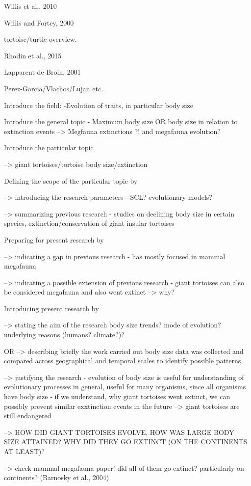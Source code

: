 Willis et al., 2010

Willis and Fortey, 2000

tortoise/turtle overview.

Rhodin et al., 2015

Lapparent de Broin, 2001

Perez-Garcia/Vlachos/Lujan etc.


Introduce the field:
-Evolution of traits, in particular body size

Introduce the general topic
- Maximum body size OR body size in relation to extinction events
--> Megfauna extinctions ?! and megafauna evolution?

Introduce the particular topic

--> giant tortoises/tortoise body size/extinction

Defining the scope of the particular topic by

--> introducing the research parameters
- SCL? evolutionary models?

--> summarizing previous research
- studies on declining body size in certain species, extinction/conservation of giant insular tortoises

Preparing for present research by

--> indicating a gap in previous research
- has mostly focused in mammal megafauna

--> indicating a possible extension of previous research
- giant tortoises can also be considered megafauna and also went extinct --> why?

Introducing present research by

--> stating the aim of the research
body size trends? mode of evolution? underlying reasons (humans? climate?)?

OR 
--> describing briefly the work carried out
body size data was collected and compared across geographical and temporal scales to identify possible patterns

--> justifying the research
- evolution of body size is useful for understanding of evolutionary processes in general, useful for many organisms, since all organisms have body size
- if we understand, why giant tortoises went extinct, we can possibly prevent similar exxtinction events in the future --> giant tortoises are still endangered


--> HOW DID GIANT TORTOISES EVOLVE, HOW WAS LARGE BODY SIZE ATTAINED? WHY DID THEY GO EXTINCT (ON THE CONTINENTS AT LEAST)?


--> check mammal megafauna paper! did all of them go extinct? particularly on continents? (Barnosky et al., 2004)
